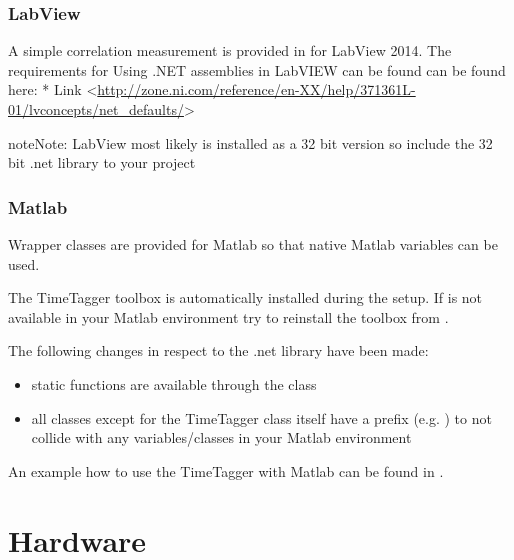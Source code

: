 \documentclass[letterpaper,10pt,english]{sphinxmanual}
\begin{document}
\subsection{LabView}
\label{sections/gettingStarted:labview}
A simple correlation measurement is provided in  for LabView 2014.
The requirements for Using .NET assemblies in LabVIEW can be found can be found here:
* Link \textless{}\url{http://zone.ni.com/reference/en-XX/help/371361L-01/lvconcepts/net\_defaults/}\textgreater{}

\begin{notice}{note}{Note:}
LabView most likely is installed as a 32 bit version so include the 32 bit .net library to your project
\end{notice}


\subsection{Matlab}
\label{sections/gettingStarted:matlab}
Wrapper classes are provided for Matlab so that native Matlab variables can be used.

The TimeTagger toolbox is automatically installed during the setup. If  is not available in your Matlab environment try to reinstall the toolbox from
.

The following changes in respect to the .net library have been made:
\begin{itemize}
\item {} 
static functions are available through the  class

\item {} 
all classes except for the TimeTagger class itself have a  prefix (e.g. ) to not collide with any variables/classes in your Matlab environment

\end{itemize}

An example how to use the TimeTagger with Matlab can be found in .


\chapter{Hardware}
\label{sections/hardware:hardware}\label{sections/hardware::doc}
\end{document}
